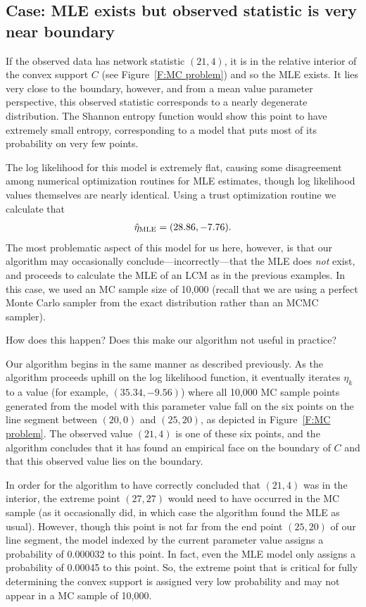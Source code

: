 \subsection{Case: MLE exists but observed statistic is very near boundary} 
\label{S:Example:9node problematic point}
If the observed data has network statistic $(21, 4)$, it is in the relative interior of 
the convex support $C$ (see Figure~\ref{F:MC problem}) and so the MLE exists.
It lies very close to the boundary, however, and from a mean value parameter 
perspective, this observed statistic 
corresponds to a nearly degenerate distribution. The Shannon entropy function would show this 
point to have extremely small entropy, corresponding to a model that puts most of its 
probability on very few points.

The log likelihood for this model is extremely flat, causing some disagreement among 
numerical optimization routines for MLE estimates, though log likelihood values 
themselves are nearly identical.  Using a trust optimization routine we calculate that 
\begin{align*}
\hat{\eta}_{\textrm{MLE}} = (28.86, -7.76).
\end{align*}
The most problematic aspect of this model for us here, however, is that our algorithm 
may occasionally conclude---incorrectly---that the MLE does \emph{not} exist, 
and proceeds to 
calculate the MLE of an LCM as in the previous examples.  In this case, we used
an MC sample size of 10,000 (recall that we are using a perfect Monte Carlo sampler
from the exact distribution rather than an MCMC sampler).

How does this happen?  Does this make our algorithm not useful in practice?

Our algorithm begins in the same manner as described previously.  As the algorithm 
proceeds uphill on the log likelihood function, it eventually iterates $\eta_k$ to a 
value (for example, $(35.34, -9.56)$) where all 10,000 MC sample points generated 
from the model with this parameter value fall on the six points on the line segment 
between $(20,0)$ and $(25,20)$, as depicted in Figure~\ref{F:MC problem}.  
The observed value $(21,4)$ is one of these six points, and the algorithm concludes
that it has found an empirical face on the boundary of $C$ and that 
this observed value lies on the boundary.

In order for the algorithm to have correctly concluded that $(21,4)$ was in the 
interior, the extreme point $(27,27)$ would need to have occurred in the MC sample
(as it occasionally did, in which case the algorithm found the MLE as usual).  
However, though this point is not far from the end point $(25,20)$ of our line
segment, the model indexed by the current parameter value 
assigns a probability of 0.000032 to this point.  In fact, even the 
MLE model only assigns a probability of 0.00045 to this point.  
So, the extreme point that is critical for fully determining the convex support 
is assigned very low probability and may not appear in a MC sample of 10,000.

